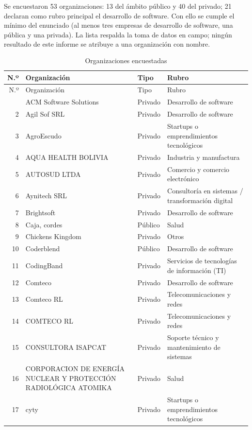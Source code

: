 Se encuestaron 53 organizaciones: 13 del ámbito público y 40 del privado; 21 declaran como rubro principal el desarrollo de software. Con ello se cumple el mínimo del enunciado (al menos tres empresas de desarrollo de software, una pública y una privada). La lista respalda la toma de datos en campo; ningún resultado de este informe se atribuye a una organización con nombre.

{\small
\begin{longtable}{rL{6.2cm}lL{4.6cm}}
\caption{Organizaciones encuestadas}\\
\toprule
N.º & Organización & Tipo & Rubro \\
\midrule
\endfirsthead
\toprule
N.º & Organización & Tipo & Rubro \\
\midrule
\endhead
\bottomrule
{} & ACM Software Solutions & Privado & Desarrollo de software \\
2 & Agil Sof SRL & Privado & Desarrollo de software \\
3 & AgroEscudo & Privado & Startups o emprendimientos tecnológicos \\
4 & AQUA HEALTH BOLIVIA & Privado & Industria y manufactura \\
5 & AUTOSUD LTDA & Privado & Comercio y comercio electrónico \\
6 & Aynitech SRL & Privado & Consultoría en sistemas / transformación digital \\
7 & Brightsoft & Privado & Desarrollo de software \\
8 & Caja, cordes & Público & Salud \\
9 & Chickens Kingdom & Privado & Otros \\
10 & Coderblend & Público & Desarrollo de software \\
11 & CodingBand & Privado & Servicios de tecnologías de información (TI) \\
12 & Comteco & Privado & Desarrollo de software \\
13 & Comteco RL & Privado & Telecomunicaciones y redes \\
14 & COMTECO RL & Privado & Telecomunicaciones y redes \\
15 & CONSULTORA ISAPCAT & Privado & Soporte técnico y mantenimiento de sistemas \\
16 & CORPORACION DE ENERGÍA NUCLEAR Y PROTECCIÓN RADIOLÓGICA ATOMIKA & Privado & Salud \\
17 & cyty & Privado & Startups o emprendimientos tecnológicos \\

\end{longtable}}
